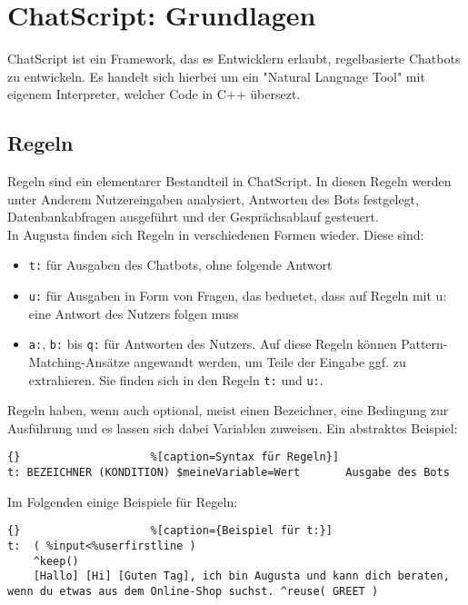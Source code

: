 \chapter{ChatScript: Grundlagen}
\label{sec:ChatScript: Grundlagen}

ChatScript ist ein Framework, das es Entwicklern erlaubt, regelbasierte Chatbots zu entwickeln. Es handelt sich hierbei um  ein "Natural Language Tool" mit eigenem Interpreter, welcher Code in C++ übersezt. 


\section{Regeln}
\label{sec:ChatScript: Regeln}

Regeln sind ein elementarer Bestandteil in ChatScript. In diesen Regeln werden unter Anderem Nutzereingaben analysiert, Antworten des Bots festgelegt, Datenbankabfragen ausgeführt und der Gesprächsablauf gesteuert.\\
In Augusta finden sich Regeln in verschiedenen Formen wieder. Diese sind: 

\begin{itemize}
\item {\lstinline|t:|  für Ausgaben des Chatbots, ohne folgende Antwort}
\item {\lstinline|u:|  für Ausgaben in Form von Fragen, das beduetet, dass auf Regeln mit u: eine Antwort des Nutzers folgen muss} 
\item {\lstinline|a:|, \lstinline|b:| bis \lstinline|q:|  für Antworten des Nutzers. Auf diese Regeln können Pattern-Matching-Ansätze angewandt werden, um Teile der Eingabe ggf. zu extrahieren. Sie finden sich in den Regeln \lstinline|t:| und \lstinline|u:|.}
\end{itemize}

Regeln haben, wenn auch  optional, meist einen Bezeichner, eine Bedingung zur Ausführung und es lassen sich dabei Variablen zuweisen. Ein abstraktes Beispiel:

\begin{lstlisting}{}					%[caption=Syntax für Regeln}]
t: BEZEICHNER (KONDITION) $meineVariable=Wert		Ausgabe des Bots
\end{lstlisting}

Im Folgenden einige Beispiele für Regeln:

\begin{lstlisting}{}					%[caption={Beispiel für t:}]
t:  ( %input<%userfirstline )
    ^keep()
    [Hallo] [Hi] [Guten Tag], ich bin Augusta und kann dich beraten, wenn du etwas aus dem Online-Shop suchst. ^reuse( GREET )
\end{lstlisting}

